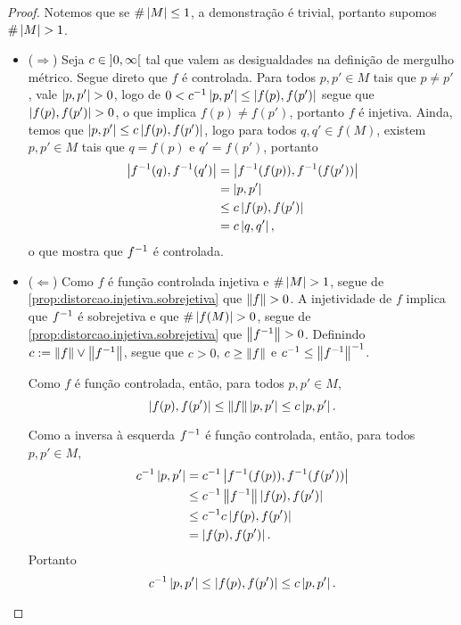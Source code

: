 \begin{proof}
Notemos que se $\#\left\lvert{M}\right\rvert \leq 1$, a demonstração é trivial, portanto supomos $\#\left\lvert{M}\right\rvert > 1$.
	\begin{itemize}
	\item ($\Rightarrow$) Seja $c \in \left]{0},{\infty}\right[$ tal que valem as desigualdades na definição de mergulho métrico. Segue direto que $f$ é controlada. Para todos $p,p' \in M$ tais que $p \neq p'$, vale $\left\vert{p},{p'}\right\vert > 0$, logo de $0 < c^{-1} \left\vert{p},{p'}\right\vert \leq \left\vert{f(p)},{f(p')}\right\vert$ segue que $\left\vert{f(p)},{f(p')}\right\vert>0$, o que implica $f(p) \neq f(p')$, portanto $f$ é injetiva. Ainda, temos que $\left\vert{p},{p'}\right\vert \leq c \left\vert{f(p)},{f(p')}\right\vert$, logo para todos $q,q' \in f(M)$, existem $p,p' \in M$ tais que $q=f(p)$ e $q'=f(p')$, portanto
		\begin{align*}
		\left\vert{f^{-1}(q)},{f^{-1}(q')}\right\vert &= \left\vert{f^{-1}(f(p))},{f^{-1}(f(p'))}\right\vert \\
			&= \left\vert{p},{p'}\right\vert \\
			&\leq c \left\vert{f(p)},{f(p')}\right\vert \\
			&= c \left\vert{q},{q'}\right\vert,
		\end{align*}
	o que mostra que $f^{-1}$ é controlada.

	\item ($\Leftarrow$) Como $f$ é função controlada injetiva e $\#\left\lvert{M}\right\rvert>1$, segue de \ref{prop:distorcao.injetiva.sobrejetiva} que $\left\Vert{f}\right\Vert>0$. A injetividade de $f$ implica que $f^{-1}$ é sobrejetiva e que $\#\left\lvert{f(M)}\right\rvert>0$, segue de \ref{prop:distorcao.injetiva.sobrejetiva} que $\left\Vert{f^{-1}}\right\Vert>0$. Definindo $c := \left\Vert{f}\right\Vert \mathbin{\vee} \left\Vert{f^{-1}}\right\Vert$, segue que $c > 0$, $c \geq \left\Vert{f}\right\Vert$ e $c^{-1} \leq \left\Vert{f^{-1}}\right\Vert^{-1}$.
	
	Como $f$ é função controlada, então, para todos $p,p' \in M$,
		\begin{equation*}
		\left\vert{f(p)},{f(p')}\right\vert \leq \left\Vert{f}\right\Vert \left\vert{p},{p'}\right\vert \leq c \left\vert{p},{p'}\right\vert.
		\end{equation*}
	
	Como a inversa à esquerda $f^{-1}$ é função controlada, então, para todos $p,p' \in M$,
		\begin{align*}
		c^{-1} \left\vert{p},{p'}\right\vert &= c^{-1} \left\vert{f^{-1}(f(p))},{f^{-1}(f(p'))}\right\vert \\
			&\leq c^{-1} \left\Vert{f^{-1}}\right\Vert \left\vert{f(p)},{f(p')}\right\vert \\
			&\leq c^{-1} c\left\vert{f(p)},{f(p')}\right\vert \\
			&= \left\vert{f(p)},{f(p')}\right\vert.
		\end{align*}
	Portanto
		\begin{equation*}
		c^{-1} \left\vert{p},{p'}\right\vert \leq \left\vert{f(p)},{f(p')}\right\vert \leq c \left\vert{p},{p'}\right\vert.
		\qedhere
		\end{equation*}
	\end{itemize}
\end{proof}

